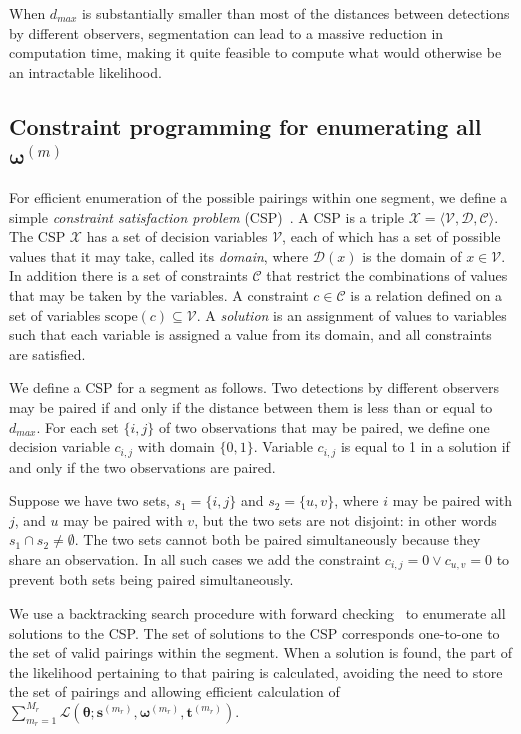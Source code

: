 \documentclass[useAMS, usenatbib, referee]{biom}\usepackage[]{graphicx}\usepackage[]{color}
\begin{document}
When $d_{max}$ is substantially smaller than most of the distances between detections by different observers, segmentation can lead to a massive reduction in computation time, making it quite feasible to compute what would otherwise be an intractable likelihood.

\subsection{Constraint programming for enumerating all $\bm{\omega}^{(m)}$}
\label{sec:constrprog}

For efficient enumeration of the possible pairings within one segment, we define a simple \textit{constraint satisfaction problem} (CSP)~\cite[Chapter 6]{russell-norvig-aima3}. A CSP is a triple \(\mathcal{X}=\langle \mathcal{V}, \mathcal{D}, \mathcal{C} \rangle\).  The CSP \(\mathcal{X}\) has a set of decision variables \(\mathcal{V}\), each of which has a set of possible values that it may take, called its \textit{domain}, where \(\mathcal{D}(x)\) is the domain of \(x \in \mathcal{V}\). In addition there is a set of constraints \(\mathcal{C}\) that restrict the combinations of values that may be taken by the variables. A constraint \(c\in \mathcal{C}\) is a relation defined on a set of variables \(\mathrm{scope}(c)\subseteq \mathcal{V}\). A \textit{solution} is an assignment of values to variables such that each variable is assigned a value from its domain, and all constraints are satisfied.

We define a CSP for a segment as follows. Two detections by different observers may be paired if and only if the distance between them is less than or equal to \(d_{max}\). For each set \(\{i,j\}\) of two observations that may be paired, we define one decision variable \(c_{i,j}\) with domain \(\{0,1\}\). Variable \(c_{i,j}\) is equal to 1 in a solution if and only if the two observations are paired.

Suppose we have two sets, \(s_1=\{i,j\}\) and \(s_2=\{u,v\}\), where  \(i\) may be paired with \(j\), and \(u\) may be paired with \(v\), but the two sets are not disjoint: in other words \(s_1 \cap s_2 \ne \emptyset\). The two sets cannot both be paired simultaneously because they share an observation. In all such cases we add the constraint \(c_{i,j}=0 \vee c_{u,v}=0\) to prevent both sets being paired simultaneously.

We use a backtracking search procedure with forward checking~\cite[Chapter 6]{russell-norvig-aima3} to enumerate all solutions to the CSP. The set of solutions to the CSP corresponds one-to-one to the set of valid pairings within the segment. When a solution is found, the part of the likelihood pertaining to that pairing is calculated, avoiding the need to store the set of pairings and allowing efficient calculation of $\sum_{m_r=1}^{M_r}\mathcal{L}\left(\bm{\theta};\bm{s}^{(m_r)},\bm{\omega}^{(m_r)},\bm{t}^{(m_r)}\right)$.
\end{document}
